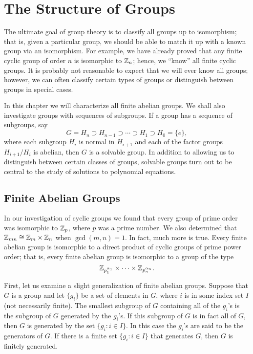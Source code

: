 \chapter{The Structure of  Groups}\label{struct}
 

The ultimate goal of group theory is to classify all groups up to
isomorphism; that is, given a particular group, we should be able to
match it up with a known group via an isomorphism. For example, we
have already proved that any finite cyclic group of order $n$ is
isomorphic to ${\Bbb Z}_n$; hence, we ``know'' all finite cyclic
groups. It is probably not reasonable to expect that we will ever know
all groups; however, we can often classify certain types of groups or
distinguish between groups in special cases.  

In this chapter we will characterize all finite abelian groups. We
shall also investigate groups with sequences of subgroups.  If a group
has a sequence of subgroups, say 
\[
G = H_n \supset H_{n-1} \supset \cdots \supset H_1 \supset H_0 = \{ e
\}, 
\]
where each subgroup $H_i$ is normal in $H_{i+1}$ and each of the
factor groups $H_{i+1}/H_i$ is abelian, then $G$ is a solvable group.
In addition to allowing us to distinguish between certain classes of
groups, solvable groups turn out to be central to the study of
solutions to polynomial equations.
 

\section{Finite Abelian Groups}

In our investigation of cyclic groups we found that every group of
prime order was isomorphic to ${\Bbb Z}_p$, where $p$ was a prime
number.  We also determined that ${\Bbb Z}_{mn} \cong {\Bbb Z}_m
\times {\Bbb Z}_n$ when $\gcd(m, n) =1$. In fact, much more is true.
Every finite abelian group is isomorphic to a direct product of cyclic
groups of prime power order; that is, every finite abelian group is
isomorphic to a group of the type 
\[
{\Bbb Z}_{p_1^{\alpha_1}} \times \cdots \times {\Bbb
Z}_{p_n^{\alpha_n}}.
\]

First, let us examine a slight generalization  of finite abelian
groups. Suppose that $G$ is a group and let $\{ g_i\}$ be a set of 
elements in $G$, where $i$ is in some index set $I$ (not necessarily 
finite).  The smallest subgroup of $G$ containing all of the $g_i$'s 
is the subgroup of $G$ {\bfi generated\/} by the $g_i$'s. If this 
subgroup of $G$ is in fact all of $G$, then $G$ is generated by the 
set $\{g_i : i \in I \}$. In this case the $g_i$'s are said to be 
the {\bfi generators\/} of $G$. If there is a finite set 
$\{ g_i : i \in I \}$ that generates $G$, then $G$ is {\bfi finitely 
generated}.
 
